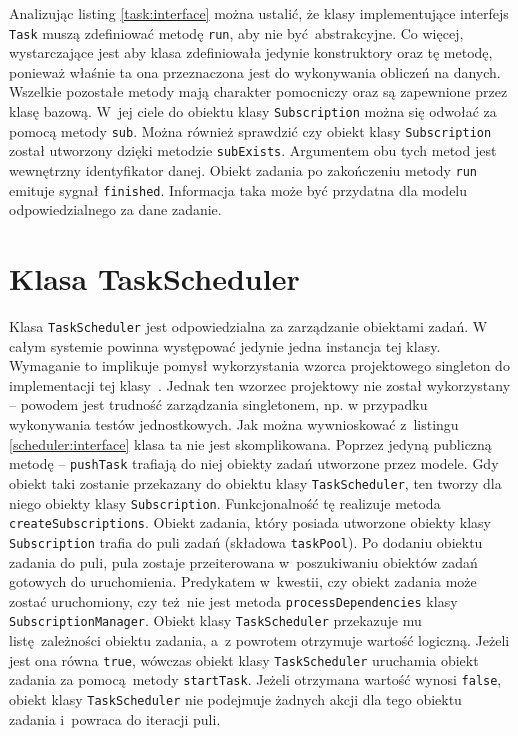 Analizując listing \ref{task:interface} można ustalić, że klasy implementujące interfejs \lstinline$Task$ muszą zdefiniować metodę \lstinline$run$, aby nie być abstrakcyjne. Co więcej, wystarczające jest aby klasa zdefiniowała jedynie konstruktory oraz tę metodę, ponieważ właśnie ta ona przeznaczona jest do wykonywania obliczeń na danych. Wszelkie pozostałe metody mają charakter pomocniczy oraz są zapewnione przez klasę bazową. W~jej ciele do obiektu klasy \lstinline$Subscription$ można się odwołać za pomocą metody \lstinline$sub$. Można również sprawdzić czy obiekt klasy \lstinline$Subscription$ został utworzony dzięki metodzie \lstinline$subExists$. Argumentem obu tych metod jest wewnętrzny identyfikator danej. Obiekt zadania po zakończeniu metody \lstinline$run$ emituje sygnał \lstinline$finished$. Informacja taka może być przydatna dla modelu odpowiedzialnego za dane zadanie.

\section{Klasa TaskScheduler} 
Klasa \lstinline$TaskScheduler$ jest odpowiedzialna za zarządzanie obiektami zadań. W całym systemie powinna występować jedynie jedna instancja tej klasy. Wymaganie to implikuje pomysł wykorzystania wzorca projektowego singleton do implementacji tej klasy~\cite{singleton}. Jednak ten wzorzec projektowy nie został wykorzystany -- powodem jest trudność zarządzania singletonem, np. w przypadku wykonywania testów jednostkowych. Jak można wywnioskować z~listingu \ref{scheduler:interface} klasa ta nie jest skomplikowana. Poprzez jedyną publiczną metodę -- \lstinline$pushTask$ trafiają do niej obiekty zadań utworzone przez modele. Gdy obiekt taki zostanie przekazany do obiektu klasy \lstinline$TaskScheduler$, ten tworzy dla niego obiekty klasy \lstinline$Subscription$. Funkcjonalność tę realizuje metoda \lstinline$createSubscriptions$. Obiekt zadania, który posiada utworzone obiekty klasy \lstinline$Subscription$ trafia do puli zadań (składowa \lstinline$taskPool$). Po dodaniu obiektu zadania do puli, pula zostaje przeiterowana w~poszukiwaniu obiektów zadań gotowych do uruchomienia. Predykatem w~kwestii, czy obiekt zadania może zostać uruchomiony, czy też nie jest metoda \lstinline$processDependencies$ klasy \lstinline$SubscriptionManager$. Obiekt klasy \lstinline$TaskScheduler$ przekazuje mu listę zależności obiektu zadania, a~z powrotem otrzymuje wartość logiczną. Jeżeli jest ona równa \lstinline$true$, wówczas obiekt klasy \lstinline$TaskScheduler$ uruchamia obiekt zadania za pomocą metody \lstinline$startTask$. Jeżeli otrzymana wartość wynosi \lstinline$false$, obiekt klasy \lstinline$TaskScheduler$ nie podejmuje żadnych akcji dla tego obiektu zadania i~powraca do iteracji puli.

